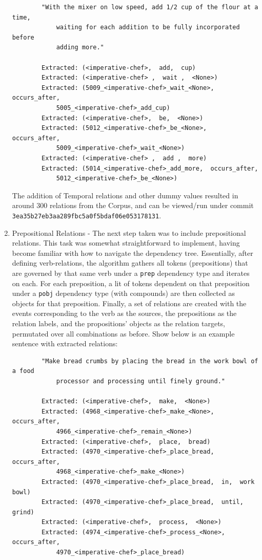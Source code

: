 \documentclass[11pt,letterpaper]{article}
\begin{document}
\begin{enumerate}
    \begin{verbatim}
        "With the mixer on low speed, add 1/2 cup of the flour at a time, 
            waiting for each addition to be fully incorporated before 
            adding more."
            
        Extracted: (<imperative-chef>,  add,  cup)
        Extracted: (<imperative-chef> ,  wait ,  <None>)
        Extracted: (5009_<imperative-chef>_wait_<None>,  occurs_after,  
            5005_<imperative-chef>_add_cup)
        Extracted: (<imperative-chef>,  be,  <None>)
        Extracted: (5012_<imperative-chef>_be_<None>,  occurs_after,  
            5009_<imperative-chef>_wait_<None>)
        Extracted: (<imperative-chef> ,  add ,  more)
        Extracted: (5014_<imperative-chef>_add_more,  occurs_after,  
            5012_<imperative-chef>_be_<None>)
    \end{verbatim}
    
    
    The addition of Temporal relations and other dummy values resulted in around 300 relations from the Corpus, and can be viewed/run under commit \texttt{3ea35b27eb3aa289fbc5a0f5bdaf06e053178131}.
    
    \item Prepositional Relations - The next step taken was to include prepositional relations.  This task was somewhat straightforward to implement, having become familiar with how to navigate the dependency tree.  Essentially, after defining verb-relations, the algorithm gathers all tokens (prepositions) that are governed by that same verb under a \texttt{prep} dependency type and iterates on each.  For each preposition, a lit of tokens dependent on that preposition under a \texttt{pobj} dependency type (with compounds) are then collected as objects for that preposition.  Finally, a set of relations are created with the events corresponding to the verb as the sources, the prepositions as the relation labels, and the propositions' objects as the relation targets, permutated over all combinations as before.  Show below is an example sentence with extracted relations:
    
    \begin{verbatim}
        "Make bread crumbs by placing the bread in the work bowl of a food 
            processor and processing until finely ground."
            
        Extracted: (<imperative-chef>,  make,  <None>)
        Extracted: (4968_<imperative-chef>_make_<None>,  occurs_after,  
            4966_<imperative-chef>_remain_<None>)
        Extracted: (<imperative-chef>,  place,  bread)
        Extracted: (4970_<imperative-chef>_place_bread,  occurs_after,  
            4968_<imperative-chef>_make_<None>)
        Extracted: (4970_<imperative-chef>_place_bread,  in,  work bowl)
        Extracted: (4970_<imperative-chef>_place_bread,  until,  grind)
        Extracted: (<imperative-chef>,  process,  <None>)
        Extracted: (4974_<imperative-chef>_process_<None>,  occurs_after, 
            4970_<imperative-chef>_place_bread)
    \end{verbatim}
    

\end{enumerate}
\end{document}
